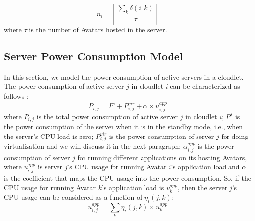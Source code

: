 \documentclass[journal,12pt,draftclsnofoot,onecolumn]{IEEEtran}
\begin{document}
\begin{equation}
{{n}_{i}}=\left\lceil \frac{\sum\limits_{k}{\delta \left( i,k \right)}}{\tau } \right\rceil 
\end{equation}
where $\tau$ is the number of Avatars hosted in the server.
	\subsection{Server Power Consumption Model}
		In this section, we model the power consumption of active servers in a cloudlet. The power consumption of active server $j$ in cloudlet $i$ can be characterized as follows \cite{19}:
		\begin{equation}
			{{P}_{i,j}}={{P}^{s}}+P_{i,j}^{vir}+\alpha \times u_{i,j}^{app}
		\end{equation}		
where $P_{i,j}$ is the total power consumption of active server $j$ in cloudlet $i$; $P^s$ is the power consumption of the server when it is in the standby mode, i.e., when the server's CPU load is zero; $P_{i,j}^{vir}$ is the power consumption of server $j$ for doing virtualization and we will discuss it in the next paragraph; $\alpha_{i,j}^{app}$ is the power consumption of server $j$ for running different applications on its hosting Avatars, where $u_{i,j}^{app}$ is server $j$'s CPU usage for running Avatar $i$'s application load and $\alpha$ is the coefficient that maps the CPU usage into the power consumption. So, if the CPU usage for running Avatar $k$'s application load is $u_{k}^{app}$, then the server $j$'s CPU usage can be considered as a function of $\eta_i (j,k)$:
		\begin{equation}
			u_{i,j}^{app}=\sum\limits_{k}{{{\eta }_{i}}\left( j,k \right)\times u_{k}^{app}}
		\end{equation}	
			
\end{document}
